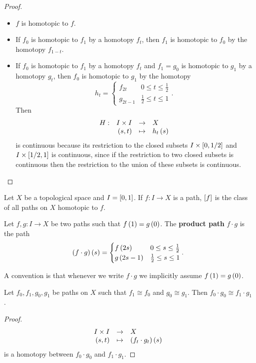 \begin{proof}
\hfill
\begin{itemize}
\item $ f $ is homotopic to $ f $.
\item If $ f_0 $ is homotopic to $ f_1 $ by a homotopy $ f_t $, then $ f_1 $ is homotopic to $ f_0 $ by the homotopy $ f_{1 - t} $.
\item If $ f_0 $ is homotopic to $ f_1 $ by a homotopy $ f_t $ and $ f_1 = g_0 $ is homotopic to $ g_1 $ by a homotopy $ g_t $, then $ f_0 $ is homotopic to $ g_1 $ by the homotopy
$$ h_t =
\begin{cases}
f_{2t} & 0 \le t \le \tfrac{1}{2} \\
g_{2t - 1} & \tfrac{1}{2} \le t \le 1
\end{cases}.
$$
Then
$$ \function[H]{I \times I}{X}{\rb{s, t}}{h_t\rb{s}} $$
is continuous because its restriction to the closed subsets $ I \times \sb{0, 1 / 2} $ and $ I \times \sb{1 / 2, 1} $ is continuous, since if the restriction to two closed subsets is continuous then the restriction to the union of these subsets is continuous.
\end{itemize}
\end{proof}


Let $ X $ be a topological space and $ I = \sb{0, 1} $. If $ f : I \to X $ is a path, $ \sb{f} $ is the class of all paths on $ X $ homotopic to $ f $.

\begin{definition*}
Let $ f, g : I \to X $ be two paths such that $ f\rb{1} = g\rb{0} $. The \textbf{product path} $ f \cdot g $ is the path
$$ \rb{f \cdot g}\rb{s} =
\begin{cases}
f\rb{2s} & 0 \le s \le \tfrac{1}{2} \\
g\rb{2s - 1} & \tfrac{1}{2} \le s \le 1
\end{cases}.
$$
\end{definition*}

A convention is that whenever we write $ f \cdot g $ we implicitly assume $ f\rb{1} = g\rb{0} $.

\begin{lemma}
\label{lem:1.2}
Let $ f_0, f_1, g_0, g_1 $ be paths on $ X $ such that $ f_1 \cong f_0 $ and $ g_0 \cong g_1 $. Then $ f_0 \cdot g_0 \cong f_1 \cdot g_1 $.
\end{lemma}

\begin{proof}
$$ \function{I \times I}{X}{\rb{s, t}}{\rb{f_t \cdot g_t}\rb{s}} $$
is a homotopy between $ f_0 \cdot g_0 $ and $ f_1 \cdot g_1 $.
\end{proof}

